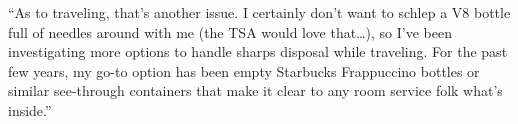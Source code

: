 \documentclass[12pt]{article}
\begin{document}
\newpage
{}

``As to traveling, that’s another issue. I certainly don’t want to schlep a V8 bottle full of needles around with me (the TSA would love that…), so I’ve been investigating more options to handle sharps disposal while traveling. For the past few years, my go-to option has been empty Starbucks Frappuccino bottles or similar see-through containers that make it clear to any room service folk what’s inside.''



\newpage
\singlespacing


\end{document}
